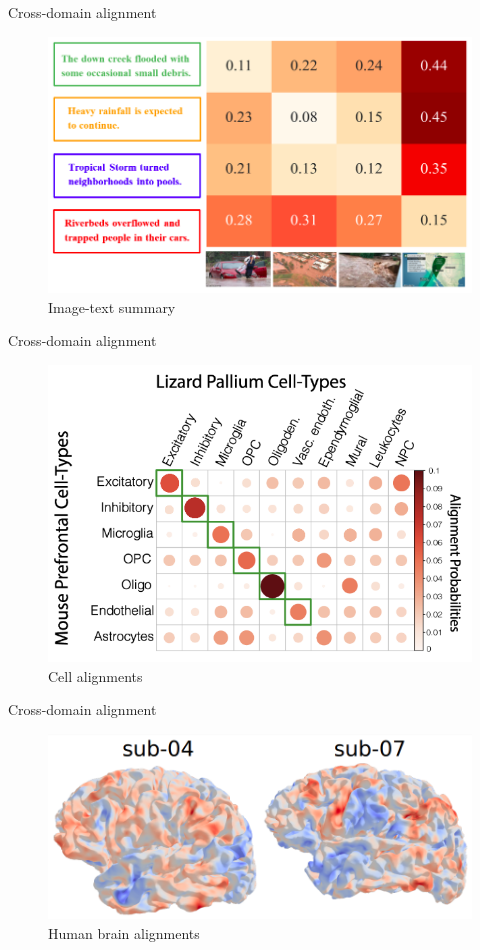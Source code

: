 \documentclass{beamer}
\begin{document}
\begin{frame}{Cross-domain alignment}
  \begin{figure}
    \centering
    \includegraphics[width=0.7\linewidth, keepaspectratio=true]{OT_new/img2text.png}
    \caption*{\scriptsize{Image-text summary \parencite{Qiu23}}}
  \end{figure}
\end{frame}

\begin{frame}{Cross-domain alignment}
  \begin{figure}
    \centering
    \includegraphics[width=0.7\linewidth, keepaspectratio=true]{OT_new/xSp_cellAlign.png}
    \caption*{\scriptsize{Cell alignments \parencite{Demetci23}}}
  \end{figure}
\end{frame}

\begin{frame}{Cross-domain alignment}
  \begin{figure}
    \centering
    \includegraphics[width=0.7\linewidth, keepaspectratio=true]{OT_new/brain.png}
    \caption*{\scriptsize{Human brain alignments \parencite{Thual22}}}
  \end{figure}
\end{frame}
\end{document}
